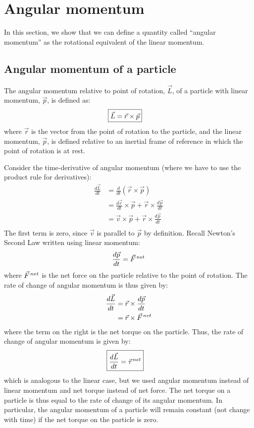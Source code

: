 \section{Angular momentum}
In this section, we show that we can define a quantity called ``angular momentum'' as the rotational equivalent of the linear momentum.
\subsection{Angular momentum of a particle}
The angular momentum relative to point of rotation, $\vec L$, of a particle with linear momentum, $\vec p$, is defined as:
\begin{align}
\Aboxed{\vec L = \vec r\times \vec p}
\end{align}
where $\vec r$ is the vector from the point of rotation to the particle, and the linear momentum, $\vec p$, is defined relative to an inertial frame of reference in which the point of rotation is at rest.

Consider the time-derivative of angular momentum (where we have to use the product rule for derivatives):
\begin{align*}
\frac{d\vec L}{dt}  &= \frac{d}{dt} (\vec r\times \vec p)\\
&=\frac{d\vec r}{dt}\times \vec p + \vec r\times\frac{d\vec p}{dt}\\
&=\vec v\times \vec p + \vec r\times\frac{d\vec p}{dt}\\
\end{align*}
The first term is zero, since $\vec v$ is parallel to $\vec p$ by definition. Recall Newton's Second Law written using linear momentum:
\begin{align*}
\frac{d\vec p}{dt} = \pvec F^{net}
\end{align*}
where $\pvec F^{net}$ is the net force on the particle relative to the point of rotation. The rate of change of angular momentum is thus given by:
\begin{align*}
\frac{d\vec L }{dt} &= \vec r\times\frac{d\vec p}{dt}\\
&=\vec r\times\pvec F^{net}
\end{align*}
where the term on the right is the net torque on the particle. Thus, the rate of change of angular momentum is given by:
\begin{align}
\Aboxed{\frac{d\vec L}{dt}   = \pvec \tau^{net}}
\end{align}
which is analogous to the linear case, but we used angular momentum instead of linear momentum and net torque instead of net force. The net torque on a particle is thus equal to the rate of change of its angular momentum. In particular, the angular momentum of a particle will remain constant (not change with time) if the net torque on the particle is zero. 

